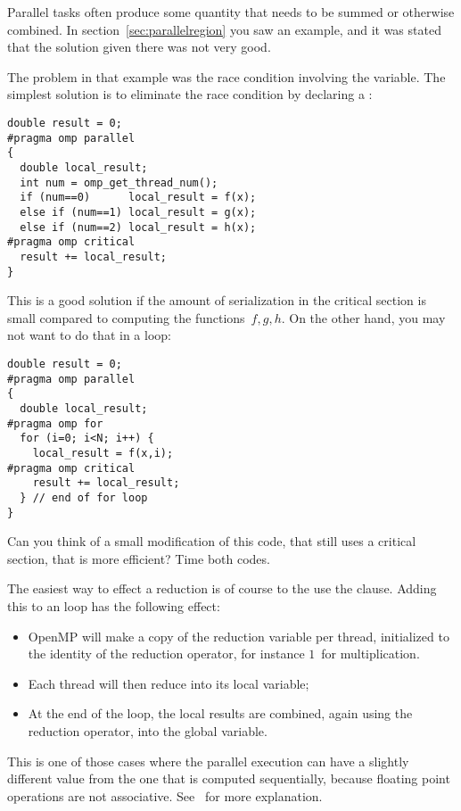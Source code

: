 Parallel tasks often produce some quantity that needs to be summed
or otherwise combined.
In section~\ref{sec:parallelregion} you saw an example, and it was stated that the
solution given there was not very good.

The problem in that example was the race condition involving the 
variable. The simplest solution is to eliminate the race condition
by declaring a :
\begin{verbatim}
double result = 0;
#pragma omp parallel
{
  double local_result;
  int num = omp_get_thread_num();
  if (num==0)      local_result = f(x);
  else if (num==1) local_result = g(x);
  else if (num==2) local_result = h(x);
#pragma omp critical
  result += local_result;
}
\end{verbatim}

This is a good solution if the amount of serialization in the critical section
is small compared to computing the functions~$f,g,h$. On the other hand, you
may not want to do that in a loop:
\begin{verbatim}
double result = 0;
#pragma omp parallel
{
  double local_result;
#pragma omp for
  for (i=0; i<N; i++) {
    local_result = f(x,i);
#pragma omp critical
    result += local_result;
  } // end of for loop
}
\end{verbatim}
\begin{exercise}
  Can you think of a small modification of this code, that still uses a critical section,
  that is more efficient? Time both codes.
\end{exercise}

The easiest way to effect a reduction is of course to the use the 
clause. Adding this to an  loop has the following effect:
\begin{itemize}
\item OpenMP will make a copy of the reduction variable per thread,
  initialized to the identity of the reduction operator, for instance
  $1$~for multiplication.
\item Each thread will then reduce into its local variable;
\item At the end of the loop, the local results are combined, again
  using the reduction operator, into the global variable.
\end{itemize}
This is one of those cases where the parallel execution can have a slightly different
value from the one that is computed sequentially, because floating point operations
are not associative. See~ for more explanation.

